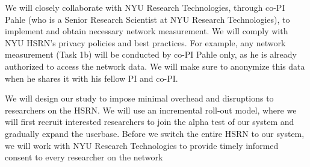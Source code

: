 We will closely collaborate with NYU Research Technologies, through co-PI Pahle (who is a Senior Research Scientist at NYU Research Technologies), to implement and obtain necessary network measurement. We will comply with NYU HSRN's privacy policies and best practices. For example, any network measurement (Task 1b) will be conducted by co-PI Pahle only, as he is already authorized to access the network data. We will make sure to anonymize this data when he shares it with his fellow PI and co-PI.

We will design our study to impose minimal overhead and disruptions to researchers on the HSRN. We will use an incremental roll-out model, where we will first recruit interested researchers to join the alpha test of our system and gradually expand the userbase. Before we switch the entire HSRN to our system, we will work with NYU Research Technologies to provide timely informed consent to every researcher on the network



